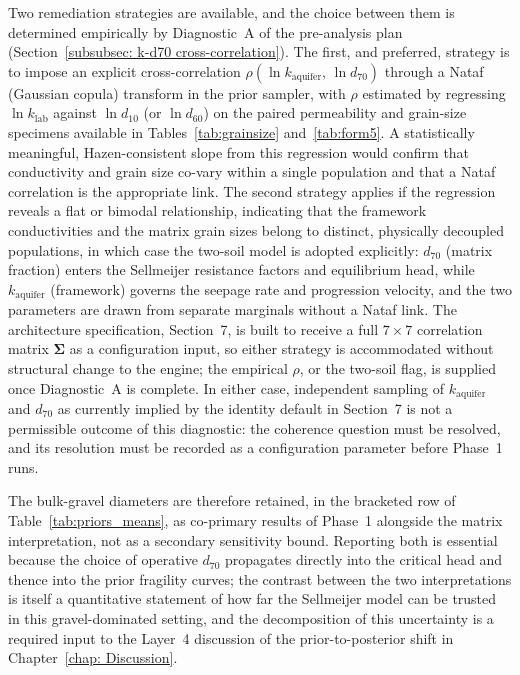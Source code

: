 Two remediation strategies are available, and the choice between them is determined empirically by Diagnostic~A of the pre-analysis plan (Section~\ref{subsubsec: k-d70 cross-correlation}). The first, and preferred, strategy is to impose an explicit cross-correlation $\rho(\ln k_\mathrm{aquifer},\, \ln d_{70})$ through a Nataf (Gaussian copula) transform in the prior sampler, with $\rho$ estimated by regressing $\ln k_\mathrm{lab}$ against $\ln d_{10}$ (or $\ln d_{60}$) on the paired permeability and grain-size specimens available in Tables~\ref{tab:grainsize} and~\ref{tab:form5}. A statistically meaningful, Hazen-consistent slope from this regression would confirm that conductivity and grain size co-vary within a single population and that a Nataf correlation is the appropriate link. The second strategy applies if the regression reveals a flat or bimodal relationship, indicating that the framework conductivities and the matrix grain sizes belong to distinct, physically decoupled populations, in which case the two-soil model is adopted explicitly: $d_{70}$ (matrix fraction) enters the Sellmeijer resistance factors and equilibrium head, while $k_\mathrm{aquifer}$ (framework) governs the seepage rate and progression velocity, and the two parameters are drawn from separate marginals without a Nataf link. The architecture specification, Section~7, is built to receive a full $7 \times 7$ correlation matrix $\boldsymbol{\Sigma}$ as a configuration input, so either strategy is accommodated without structural change to the engine; the empirical $\rho$, or the two-soil flag, is supplied once Diagnostic~A is complete. In either case, independent sampling of $k_\mathrm{aquifer}$ and $d_{70}$ as currently implied by the identity default in Section~7 is not a permissible outcome of this diagnostic: the coherence question must be resolved, and its resolution must be recorded as a configuration parameter before Phase~1 runs.

The bulk-gravel diameters are therefore retained, in the bracketed row of Table~\ref{tab:priors_means}, as co-primary results of Phase~1 alongside the matrix interpretation, not as a secondary sensitivity bound. Reporting both is essential because the choice of operative $d_{70}$ propagates directly into the critical head and thence into the prior fragility curves; the contrast between the two interpretations is itself a quantitative statement of how far the Sellmeijer model can be trusted in this gravel-dominated setting, and the decomposition of this uncertainty is a required input to the Layer~4 discussion of the prior-to-posterior shift in Chapter~\ref{chap: Discussion}.

